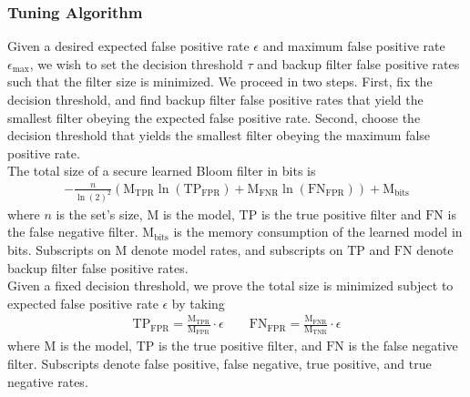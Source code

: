 
\subsubsection{Tuning Algorithm}

Given a desired expected false positive rate $\epsilon$ and maximum false positive rate $\epsilon_\textrm{max}$, we wish to set the decision threshold $\tau$ 
and backup filter false positive rates such that the filter size is minimized. We proceed in two steps. First, fix the decision threshold, and find backup 
filter false positive rates that yield the smallest filter obeying the expected false positive rate. Second, choose the decision threshold that yields the 
smallest filter obeying the maximum false positive rate. \\

\noindent
The total size of a secure learned Bloom filter in bits is 
\begin{align*}
    - \frac{n}{\ln(2)^2}\left( \text{M}_\text{TPR} \ln(\text{TP}_\text{FPR}) + \text{M}_\text{FNR} \ln(\text{FN}_\text{FPR})  \right) + \text{M}_\text{bits}
\end{align*}
where $n$ is the set's size, $\mathrm{M}$ is the model, $\mathrm{TP}$ is the true positive filter and $\mathrm{FN}$ is the false negative filter. 
$\text{M}_\text{bits}$ is the memory consumption of the learned model in bits. Subscripts on $\text{M}$ denote model rates, and subscripts on $\text{TP}$ and 
$\text{FN}$ denote backup filter false positive rates. \\

\noindent
Given a fixed decision threshold, we prove the total size is minimized subject to expected false positive rate $\epsilon$ by taking 
\begin{align*}
   \mathrm{TP}_\mathrm{FPR} = \frac{\mathrm{M}_\mathrm{TPR}}{\mathrm{M}_\mathrm{FPR}} \cdot \epsilon \qquad \mathrm{FN}_\mathrm{FPR} = \frac{\mathrm{M}_\mathrm{FNR}}{\mathrm{M}_\mathrm{TNR}} \cdot \epsilon
\end{align*}
where $\mathrm{M}$ is the model, $\mathrm{TP}$ is the true positive filter, and $\mathrm{FN}$ is the false negative filter. Subscripts denote false positive,
false negative, true positive, and true negative rates. \\

